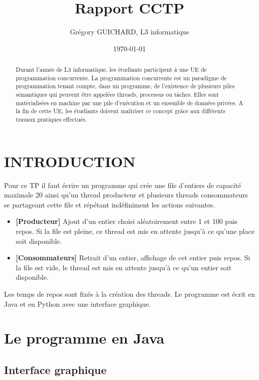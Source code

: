 \documentclass{article}
\title{Rapport CCTP}
\author{Grégory GUICHARD, L3 informatique}
\date{\today}
\begin{document}
\maketitle %


\begin{abstract}
  Durant l'année de L3 informatique, les étudiants participent à une UE de programmation concurrente.
  La programmation concurrente est un paradigme de programmation tenant compte, dans un programme, de l'existence de plusieurs piles sémantiques qui peuvent être appelées threads, processus ou tâches. Elles sont matérialisées en machine par une pile d'exécution et un ensemble de données privées.
  A la fin de cette UE, les étudiants doivent maîtriser ce concept grâce aux différents travaux pratiques effectués.
\end{abstract}

\section{INTRODUCTION}
\label{section:hello} %

Pour ce TP il faut écrire un programme qui crée une file d’entiers de capacité maximale 20 ainsi qu’un thread producteur et plusieurs threads consommateurs se partageant cette file et répétant indéfiniment
les actions suivantes.
\begin{itemize}
\item \textbf{[Producteur]} Ajout d’un entier choisi aléatoirement entre 1 et 100 puis repos. Si la file
est pleine, ce thread est mis en attente jusqu’à ce qu’une place soit disponible.
\item \textbf{[Consommateurs]} Retrait d’un entier, affichage de cet entier puis repos. Si la file est vide,
le thread est mis en attente jusqu’à ce qu’un entier soit disponible.
\end{itemize}
Les temps de repos sont fixés à la création des threads.
Le programme est écrit en Java et en Python avec une interface graphique.


\section{Le programme en Java}

\subsection{Interface graphique}
\end{document}
